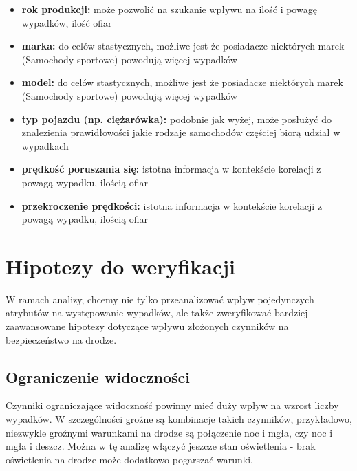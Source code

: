 \begin{itemize}
\itemsep1pt\parskip0pt
\item
  \textbf{rok produkcji:} może pozwolić na szukanie wpływu na ilość i
  powagę wypadków, ilość ofiar\\
\item
  \textbf{marka:} do celów stastycznych, możliwe jest że posiadacze
  niektórych marek (Samochody sportowe) powodują więcej wypadków\\
\item
  \textbf{model:} do celów stastycznych, możliwe jest że posiadacze
  niektórych marek (Samochody sportowe) powodują więcej wypadków\\
\item
  \textbf{typ pojazdu (np. ciężarówka):} podobnie jak wyżej, może
  posłużyć do znalezienia prawidłowości jakie rodzaje samochodów
  częściej biorą udział w wypadkach\\
\item
  \textbf{prędkość poruszania się:} istotna informacja w kontekście
  korelacji z powagą wypadku, ilością ofiar\\
\item
  \textbf{przekroczenie prędkości:} istotna informacja w kontekście
  korelacji z powagą wypadku, ilością ofiar
\end{itemize}

\section{Hipotezy do weryfikacji}\label{hipotezy-do-weryfikacji}

W ramach analizy, chcemy nie tylko przeanalizować wpływ pojedynczych
atrybutów na występowanie wypadków, ale także zweryfikować bardziej
zaawansowane hipotezy dotyczące wpływu złożonych czynników na
bezpieczeństwo na drodze.

\subsection{Ograniczenie widoczności}\label{ograniczenie-widocznosci}

Czynniki ograniczające widoczność powinny mieć duży wpływ na wzrost
liczby wypadków. W szczególności groźne są kombinacje takich czynników,
przykładowo, niezwykle groźnymi warunkami na drodze są połączenie noc i
mgła, czy noc i mgła i deszcz. Można w tę analizę włączyć jeszcze stan
oświetlenia - brak oświetlenia na drodze może dodatkowo pogarszać
warunki.

